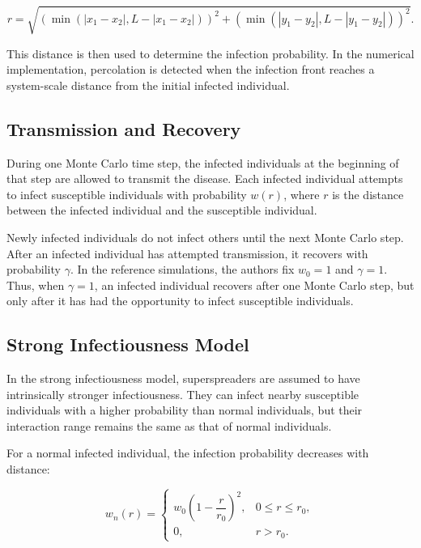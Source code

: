 \documentclass[11pt,a4paper]{article}
\begin{document}
\begin{equation}
    r =
    \sqrt{
    \left(\min\left(|x_1-x_2|, L-|x_1-x_2|\right)\right)^2
    +
    \left(\min\left(|y_1-y_2|, L-|y_1-y_2|\right)\right)^2
    }.
\end{equation}

This distance is then used to determine the infection probability. In the numerical implementation, percolation is detected when the infection front reaches a system-scale distance from the initial infected individual.

\subsection{Transmission and Recovery}

During one Monte Carlo time step, the infected individuals at the beginning of that step are allowed to transmit the disease. Each infected individual attempts to infect susceptible individuals with probability $w(r)$, where $r$ is the distance between the infected individual and the susceptible individual.

Newly infected individuals do not infect others until the next Monte Carlo step. After an infected individual has attempted transmission, it recovers with probability $\gamma$. In the reference simulations, the authors fix $w_0 = 1$ and $\gamma = 1$.
Thus, when $\gamma=1$, an infected individual recovers after one Monte Carlo step, but only after it has had the opportunity to infect susceptible individuals.

\subsection{Strong Infectiousness Model}

In the strong infectiousness model, superspreaders are assumed to have intrinsically stronger infectiousness. They can infect nearby susceptible individuals with a higher probability than normal individuals, but their interaction range remains the same as that of normal individuals.

For a normal infected individual, the infection probability decreases with distance:

\begin{equation}
    w_n(r)=
    \begin{cases}
    w_0\left(1-\dfrac{r}{r_0}\right)^2, & 0 \le r \le r_0,\\[0.8em]
    0, & r > r_0.
    \end{cases}
\end{equation}
\end{document}
